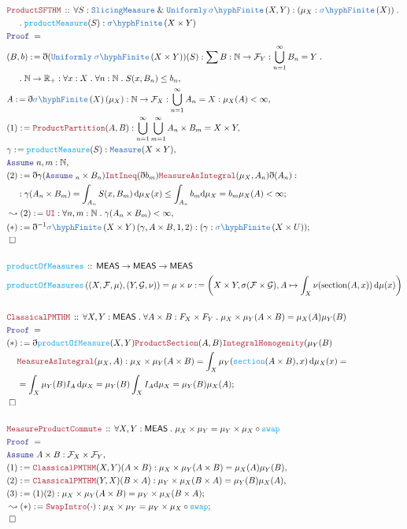 \documentclass[12pt]{scrartcl}
\newcommand{\TYPE}[1]{\textcolor{NavyBlue}{\mathtt{#1}}}
\newcommand{\FUNC}[1]{\textcolor{Cerulean}{\mathtt{#1}}}
\newcommand{\LOGIC}[1]{\textcolor{Blue}{\mathtt{#1}}}
\newcommand{\THM}[1]{\textcolor{Maroon}{\mathtt{#1}}}
\renewcommand{\.}{\; . \;}
\newcommand{\de}{: \kern 0.1pc =}
\newcommand{\Act}[1]{\left( #1 \right)}
\newcommand{\Theorem}[2]{& \THM{#1} \, :: \, #2 \\ & \Proof = \\ }
\newcommand{\DeclareFunc}[2]{& \FUNC{#1} \, :: \, #2 \\}
\newcommand{\DefineNamedFunc}[4]{&  \FUNC{#1}\Act{#2} = #3 \de #4 \\}
\newcommand{\NewLine}{\\ & \kern 1pc}
\renewcommand{\And}{\; \& \;}
\newcommand{\ForEach}[3]{\forall #1 : #2 \. #3 }
\newcommand{\Reals}{\mathbb{R} }
\newcommand{\Nat}{\mathbb{N} }
\newcommand{\Say}[3]{& #1 \de #2 : #3, \\}
\newcommand{\Conclude}[3]{& #1 \de #2 : #3; \\}
\newcommand{\Derive}[3]{& \leadsto #1 \de #2 : #3, \\}
\newcommand{\DeriveConclude}[3]{& \leadsto #1 \de #2 : #3 ; \\}
\newcommand{\A}{\LOGIC{Assume} \;}
\newcommand{\Assume}[2]{& \A #1 : #2, \\}
\newcommand{\QED}{\; \square}
\newcommand{\EndProof}{& \QED \\}
\newcommand{\ByDef}{\eth}
\newcommand{\Proof}{\LOGIC{Proof} \; }
\newcommand{\SF}[1]{\TYPE{\sigma \hyph  Finite}\left( #1 \right) }
\newcommand{\MEAS}{\mathsf{MEAS}}
\newcommand{\F}{\mathcal{F}}
\begin{document}
 \begin{align*}
\Theorem{ProductSFTHM}
{ 
\ForEach{S}
{\TYPE{SlicingMeasure} \And \TYPE{Uniformly}  \, \SF{X,Y} : (\mu_X : \SF{X}) \. \NewLine  } 
{ \FUNC{productMeasure}(S) : \SF{X \times Y} 
}}
\Say{(B,b)}{\ByDef(\TYPE{Uniformly} \; \SF{X \times Y})(S)}{ \sum B : \Nat \to \F_Y : \bigcup^\infty_{n = 1} B_n = Y \.\NewLine \. \Nat \to \Reals_+ : 
 \ForEach{x}{X}{ \ForEach{n}{\Nat}{  S(x,B_n) \le b_n }}}
\Say{A}{\ByDef \SF{X}(\mu_X)}{ \Nat \to \F_X : \bigcup^\infty_{n = 1} A_n = X : \mu_X(A) < \infty }
\Say{(1)}{\THM{ProductPartition}(A,B)}{\bigcup_{n =1}^\infty \bigcup^\infty_{m = 1} A_n \times B_m = X \times Y }
\Say{\gamma}{\FUNC{productMeasure}(S)}{\TYPE{Measure}(X \times Y)}
\Assume{n,m}{\Nat}
\Conclude{(2)}{\ByDef\gamma(\A_n \times B_n) \THM{IntIneq}(\ByDef b_m)\THM{MeasureAsIntegral}(\mu_X,A_n)\ByDef(A_n) : \NewLine }
{\gamma(A_n \times B_m) = \int_{A_n} S(x, B_m) \, \mathrm{d} \mu_X(x) \le \int_{A_n} b_m \mathrm{d} \mu_X = b_m \mu_X(A) < \infty} 
\Derive{(2)}{ \THM{UI} }{\ForEach{n,m}{\Nat}{\gamma(A_n \times B_m) < \infty}}
\Conclude{(*)}{ \ByDef^{-1} \SF{X \times Y}(\gamma,A \times B,1,2)}{(\gamma : \SF{X \times U})}
\EndProof
\\
\DeclareFunc{productOfMeasures}{ \MEAS \to \MEAS  \to \MEAS}
\DefineNamedFunc{productOfMeasures}{(X,\F,\mu),(Y,\mathcal{G},\nu) }{ \mu \times \nu }{ \Act{X \times Y, \sigma(\F \times \mathcal{G}), A \mapsto \int_X \nu(\mathrm{section}(A,x)) \, \mathrm{d}\mu(x)} }
\\
\Theorem{ClassicalPMTHM}{
\ForEach{X,Y}{\MEAS}{
\ForEach{A \times B }{ F_X \times F_Y}{ \mu_X \times \mu_Y (A \times B ) = \mu_X( A  )\mu_Y( B) }
}}
\Conclude{(*)}{\ByDef\FUNC{productOfMeasure}(X,Y)\THM{ProductSection}(A,B)\THM{IntegralHomogenity}(\mu_Y(B) \NewLine \THM{MeasureAsIntegral}(\mu_X,A) }
{  \mu_X \times \mu_Y(A \times B) = \int_X \mu_Y(\FUNC{section}(A \times B), x )\, \mathrm{d}\mu_X(x) =
\NewLine
= \int_X \mu_Y(B)I_A \, \mathrm{d}\mu_X 
 = \mu_Y(B) \int_X I_A \mathrm{d}\mu_X  = \mu_Y(B) \mu_X(A) 
}
\EndProof
\\
\Theorem{MeasureProductCommute}{
\ForEach{X,Y}{\MEAS}{ \mu_X \times \mu_Y = \mu_Y \times \mu_X \circ \FUNC{swap} }
}
\Assume{A \times B}{\F_X \times \F_Y}
\Say{ (1) }{\THM{ClassicalPMTHM}(X,Y)(A \times B)}{ \mu_X \times \mu_Y(A \times B) = \mu_X(A)\mu_Y(B) }
\Say{(2)}{\THM{ClassicalPMTHM}(Y,X)(B \times A)}{ \mu_Y \times \mu_X(B \times A) = \mu_Y(B)\mu_X(A) }
\Conclude{(3)}{(1)(2)}{ \mu_X \times \mu_Y (A \times B) = \mu_Y \times \mu_X (B \times A)}
\DeriveConclude{(*)}{\THM{SwapIntro}(\cdot)}{\mu_X \times \mu_Y = \mu_Y \times \mu_X \circ \FUNC{swap}}
\EndProof
\end{align*}
\newpage
\end{document}
